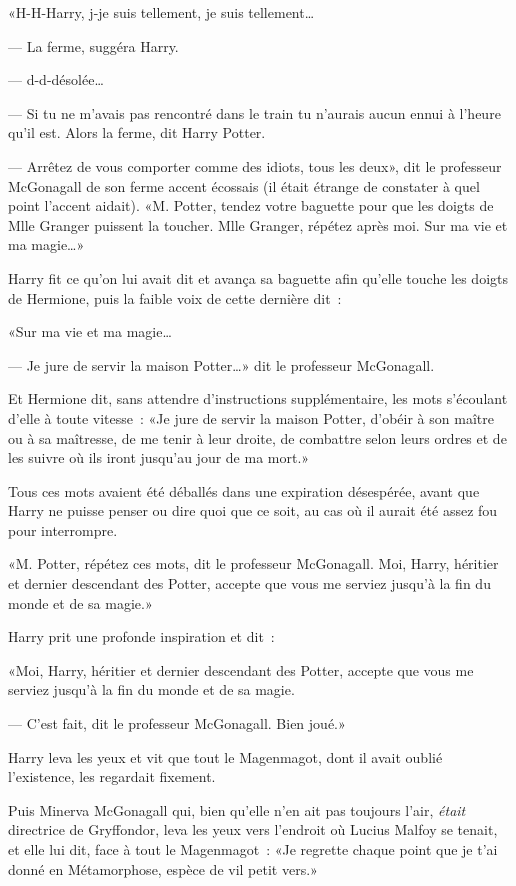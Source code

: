 «H-H-Harry, j-je suis tellement, je suis tellement…

--- La ferme, suggéra Harry.

--- d-d-désolée…

--- Si tu ne m'avais pas rencontré dans le train tu n'aurais aucun ennui à l'heure qu'il est. Alors la ferme, dit Harry Potter.

--- Arrêtez de vous comporter comme des idiots, tous les deux», dit le professeur McGonagall de son ferme accent écossais (il était étrange de constater à quel point l'accent aidait). «M. Potter, tendez votre baguette pour que les doigts de Mlle Granger puissent la toucher. Mlle Granger, répétez après moi. Sur ma vie et ma magie…»

Harry fit ce qu'on lui avait dit et avança sa baguette afin qu'elle touche les doigts de Hermione, puis la faible voix de cette dernière dit~:

«Sur ma vie et ma magie…

--- Je jure de servir la maison Potter…» dit le professeur McGonagall.

Et Hermione dit, sans attendre d'instructions supplémentaire, les mots s'écoulant d'elle à toute vitesse~: «Je jure de servir la maison Potter, d'obéir à son maître ou à sa maîtresse, de me tenir à leur droite, de combattre selon leurs ordres et de les suivre où ils iront jusqu'au jour de ma mort.»

Tous ces mots avaient été déballés dans une expiration désespérée, avant que Harry ne puisse penser ou dire quoi que ce soit, au cas où il aurait été assez fou pour interrompre.

«M. Potter, répétez ces mots, dit le professeur McGonagall. Moi, Harry, héritier et dernier descendant des Potter, accepte que vous me serviez jusqu'à la fin du monde et de sa magie.»

Harry prit une profonde inspiration et dit~:

«Moi, Harry, héritier et dernier descendant des Potter, accepte que vous me serviez jusqu'à la fin du monde et de sa magie.

--- C'est fait, dit le professeur McGonagall. Bien joué.»

Harry leva les yeux et vit que tout le Magenmagot, dont il avait oublié l'existence, les regardait fixement.

Puis Minerva McGonagall qui, bien qu'elle n'en ait pas toujours l'air, \emph{était} directrice de Gryffondor, leva les yeux vers l'endroit où Lucius Malfoy se tenait, et elle lui dit, face à tout le Magenmagot~: «Je regrette chaque point que je t'ai donné en Métamorphose, espèce de vil petit vers.»

